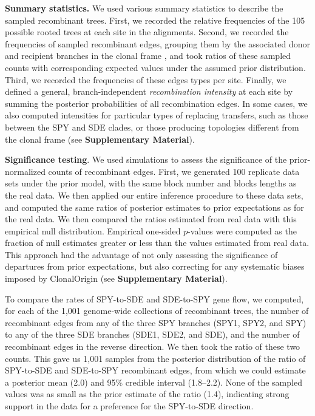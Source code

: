 \documentclass[12pt]{article}
\begin{document}

{\bf Summary statistics.}  We used various summary statistics to describe
the sampled recombinant trees.
First, we recorded the relative frequencies of the 105 possible
rooted trees at each site in the alignments.  Second, we recorded the
frequencies of sampled recombinant edges, grouping them by the associated
donor and recipient branches in the clonal frame \citep{Didelot2010}, and
took ratios of these sampled counts with corresponding expected values
under the assumed 
prior distribution.  Third, we recorded the frequencies of these edges
types per site.  Finally, we defined a general, branch-independent {\em
  recombination intensity} at each site by summing the posterior
probabilities of all recombination edges.  In some cases, we also computed
intensities for particular types of replacing transfers, such as those
between the SPY and SDE clades, or those producing topologies different
from the clonal frame
(see \textbf{Supplementary Material}).

{\bf Significance testing}.  We used simulations to assess the significance
of the
prior-normalized counts of recombinant edges.  First,
we generated 100 replicate data sets under the prior model, with the same
block number and blocks lengths as the real data.  We then applied our
entire inference procedure to these data sets, and computed the same ratios
of posterior estimates to prior expectations as for the real data.  We then
compared the ratios estimated from real data with this empirical null
distribution.  Empirical one-sided $p$-values were computed as the fraction
of null estimates greater or less than the values estimated from real data.
This approach had the advantage of not only assessing the significance of
departures from prior expectations, but also correcting for any systematic
biases imposed by ClonalOrigin
(see \textbf{Supplementary Material}).

To compare the rates of SPY-to-SDE and SDE-to-SPY gene flow, we computed,
for each of the 1,001 genome-wide collections of recombinant trees, the
number of recombinant edges from any of the three SPY branches (SPY1, SPY2,
and SPY) to any of the three SDE branches (SDE1, SDE2, and SDE), and the
number of recombinant edges in the reverse direction.  We then took the
ratio of these two counts.  This gave us 1,001 samples from the posterior
distribution of the ratio of SPY-to-SDE and SDE-to-SPY recombinant edges,
from which we could estimate a posterior mean (2.0) and 95\% credible
interval (1.8--2.2).  None of the sampled values was as small as the prior
estimate of the ratio (1.4), indicating strong support in the data for a
preference for the SPY-to-SDE direction.
\end{document}
